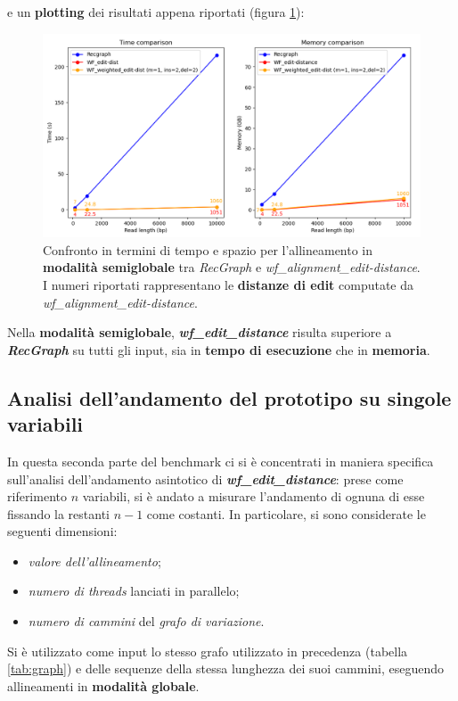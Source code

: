     e un \textbf{plotting} dei risultati appena riportati (figura \ref{fig:semiglobal_comparison}):
    \clearpage
    \begin{figure}[t]
        \centering
        \includegraphics[width=1.0\linewidth]{images/semiglobal_comparison.png} 
        \caption[Confronto modalità semiglobale]{Confronto in termini di tempo e spazio per l'allineamento in \textbf{modalità semiglobale} tra \emph{RecGraph} e \emph{wf\_alignment\_edit-distance}. I numeri riportati rappresentano le \textbf{distanze di edit} computate da \emph{wf\_alignment\_edit-distance}.}
        \label{fig:semiglobal_comparison}
    \end{figure}
    
    Nella \textbf{modalità semiglobale}, \textbf{\textit{wf\_edit\_distance}} risulta superiore a \textbf{\textit{RecGraph}} su tutti gli input, sia in \textbf{tempo di esecuzione} che in \textbf{memoria}.
    
\subsection{Analisi dell'andamento del prototipo su singole variabili}

    In questa seconda parte del benchmark ci si è concentrati in maniera specifica sull'analisi dell'andamento asintotico di \textbf{\textit{wf\_edit\_distance}}: prese come riferimento $n$ variabili, si è andato a misurare l'andamento di ognuna di esse fissando la restanti $n-1$ come costanti. In particolare, si sono considerate le seguenti dimensioni:
    \begin{itemize}
        \item \emph{valore dell'allineamento};
        \item \emph{numero di threads} lanciati in parallelo;
        \item \emph{numero di cammini} del \emph{grafo di variazione}.
    \end{itemize}
    Si è utilizzato come input lo stesso grafo utilizzato in precedenza (tabella \ref{tab:graph}) e delle sequenze della stessa lunghezza dei suoi cammini, eseguendo allineamenti in \textbf{modalità globale}.
    
